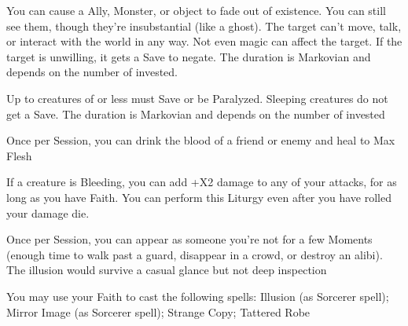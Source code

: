 {You can cause a Ally, Monster, or object to fade out of existence.  You can still see them, though they're insubstantial (like a ghost).  The target can't move, talk, or interact with the world in any way.  Not even magic can affect the target.  If the target is unwilling, it gets a Save to negate.  The duration is Markovian and depends on the number of \DICE invested.

\LITURGY [
  Name= Paralysis,
  Link=nyx-liturgy-paralysis,
  Paradigm= Mind ,
  Save=  Y (negates) ,
  Duration= Markovian ,
  Counter=  n/a  ,
  Keywords= Splittable ,
  Target=   Close or Nearby Creature
]



Up to \DICE creatures of \DICE \HD or less must Save or be Paralyzed.  Sleeping creatures do not get a Save. The duration is Markovian and depends on the number of \DICE invested



\GOD[
Name=Shezmu,
Link=small-god-shezmu,
GodOf=Prince of Blood,
Holy=a vial of blood other than your own (preferably the blood of the one who indoctrinated you into the faith)
]


Once per Session, you can drink the blood of a friend or enemy and heal to Max Flesh


If a creature is Bleeding, you can add +\DICE X2 damage to any of your attacks, for as long as you have Faith.  You can perform this Liturgy even after you have rolled your damage die.




\GOD[
Name=The King in Yellow,
Link=small-god-the king in yellow,
GodOf=Fiend of Illusion and Disguises,
Holy=a yellow cowl and mask
]


Once per Session, you can appear as someone you're not for a few Moments (enough time to walk past a guard, disappear in a crowd, or destroy an alibi).  The illusion would survive a casual glance but not deep inspection


You may use your Faith to cast the following spells: Illusion (as Sorcerer spell); Mirror Image (as Sorcerer spell); Strange Copy; Tattered Robe

\LITURGY [
  Name= Strange Copy,
  Link= king-in-yellow-liturgy-strange-copy,
  Paradigm= Mind ,
  Save=  N ,
  Duration= \SUMDICE Minutes ,
  Counter=  n/a  ,
  Keywords= None ,
  Target=   Close (touch) mirror
]



}
